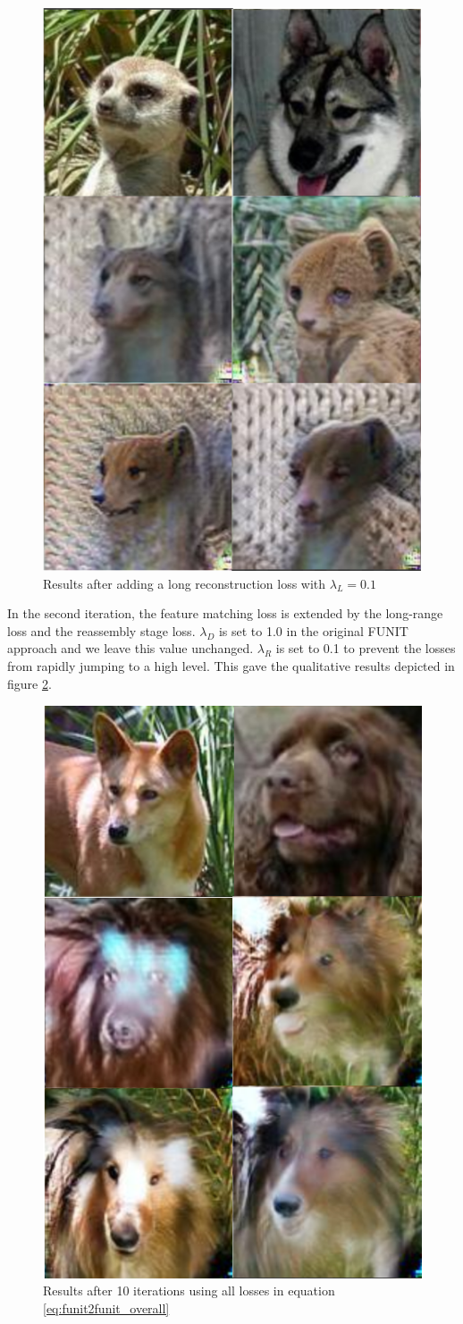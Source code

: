 \documentclass[conference]{IEEEtran}
\begin{document}
\begin{figure}[h!]
	\centering
	\includegraphics[width=0.5\linewidth]{figures/long_recon_0'1.png}
    \caption{Results after adding a long reconstruction loss with $\lambda_{L}=0.1$}
    \label{fig:imgs_long_recon}
\end{figure}

In the second iteration, the feature matching loss is extended by the long-range loss and the reassembly stage loss. $\lambda_{D}$ is set to 1.0 in the original FUNIT approach and we leave this value unchanged. $\lambda_{R}$ is set to 0.1 to prevent the losses from rapidly jumping to a high level. This gave the qualitative results depicted in figure \ref{fig:funit2funit_all_losses}.

\begin{figure}[h!]
	\centering
	\includegraphics[width=0.5\linewidth]{figures/funit2funit_all_losses.png}
	\caption{Results after 10 iterations using all losses in equation \ref{eq:funit2funit_overall}}
	\label{fig:funit2funit_all_losses}
\end{figure}
\end{document}
